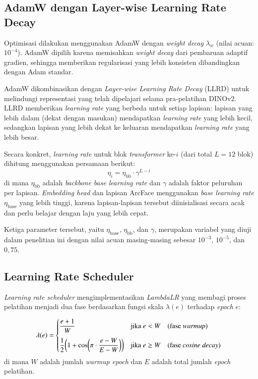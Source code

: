 \subsection{AdamW dengan Layer-wise Learning Rate Decay}

Optimisasi dilakukan menggunakan AdamW dengan \textit{weight decay} $\lambda_w$ (nilai acuan: $10^{-4}$). AdamW dipilih karena memisahkan \textit{weight decay} dari pembaruan adaptif gradien, sehingga memberikan regularisasi yang lebih konsisten dibandingkan dengan Adam standar.

AdamW dikombinasikan dengan \textit{Layer-wise Learning Rate Decay} (LLRD) untuk melindungi representasi yang telah dipelajari selama pra-pelatihan DINOv2. LLRD memberikan \textit{learning rate} yang berbeda untuk setiap lapisan: lapisan yang lebih dalam (dekat dengan masukan) mendapatkan \textit{learning rate} yang lebih kecil, sedangkan lapisan yang lebih dekat ke keluaran mendapatkan \textit{learning rate} yang lebih besar.

Secara konkret, \textit{learning rate} untuk blok \textit{transformer} ke-$i$ (dari total $L = 12$ blok) dihitung menggunakan persamaan berikut:
\begin{equation}
    \eta_i = \eta_{\text{bb}} \cdot \gamma^{L - i}
\end{equation}
di mana $\eta_{\text{bb}}$ adalah \textit{backbone base learning rate} dan $\gamma$ adalah faktor peluruhan per lapisan. \textit{Embedding head} dan lapisan ArcFace menggunakan \textit{base learning rate} $\eta_{\text{base}}$ yang lebih tinggi, karena lapisan-lapisan tersebut diinisialisasi secara acak dan perlu belajar dengan laju yang lebih cepat.

Ketiga parameter tersebut, yaitu $\eta_{\text{base}}$, $\eta_{\text{bb}}$, dan $\gamma$, merupakan variabel yang diuji dalam penelitian ini dengan nilai acuan masing-masing sebesar $10^{-3}$, $10^{-5}$, dan $0{,}75$.

\subsection{Learning Rate Scheduler}

\textit{Learning rate scheduler} mengimplementasikan \textit{LambdaLR} yang membagi proses pelatihan menjadi dua fase berdasarkan fungsi skala $\lambda(e)$ terhadap \textit{epoch} $e$:

\begin{equation}
    \lambda(e) = \begin{cases}
        \dfrac{e + 1}{W} & \text{jika } e < W \quad \text{(fase \textit{warmup})} \\[10pt]
        \dfrac{1}{2}\!\left(1 + \cos\!\left(\pi \cdot \dfrac{e - W}{E - W}\right)\right) & \text{jika } e \geq W \quad \text{(fase \textit{cosine decay})}
    \end{cases}
\end{equation}
di mana $W$ adalah jumlah \textit{warmup epoch} dan $E$ adalah total jumlah \textit{epoch} pelatihan.

